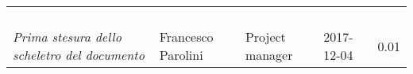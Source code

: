 \newpage 
\section*{}
\begin{table}[H]
	\centering
	\begin{tabular}{p{4cm}|C{3cm}|C{3cm}|R{2.5cm}|R{2cm}}
		
		 & & & & \\
		
		
		\emph{}	 & & & & \\
		\hline
		
		& & & & \\
		\hline
		
		& & & & \\
		\hline
		
		\emph{Prima stesura dello scheletro del documento} & Francesco Parolini & Project manager & 2017-12-04 & 0.01 \\
		
	\end{tabular}
	
\end{table}


\clearpage